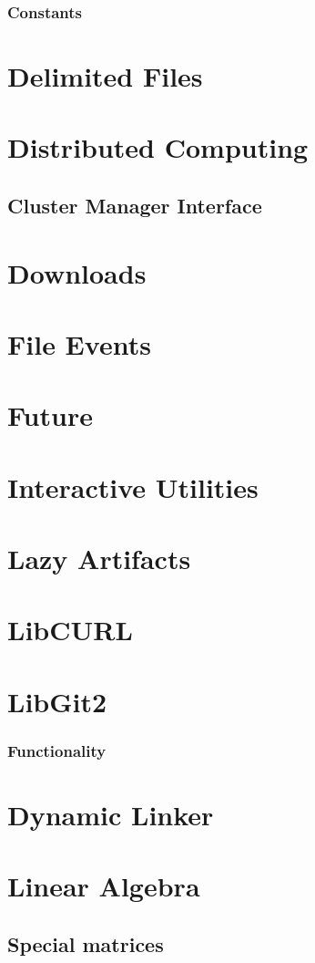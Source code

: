     \subsection{Constants}
\chapter{Delimited Files}
\chapter{Distributed Computing}
    \section{Cluster Manager Interface}
\chapter{Downloads}
\chapter{File Events}
\chapter{Future}
\chapter{Interactive Utilities}
\chapter{Lazy Artifacts}
\chapter{LibCURL}
\chapter{LibGit2}
    \subsection{Functionality}
\chapter{Dynamic Linker}
\chapter{Linear Algebra}
    \section{Special matrices}
